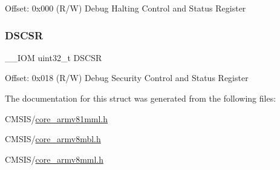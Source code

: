 Offset\+: 0x000 (R/W) Debug Halting Control and Status Register \mbox{\label{struct_core_debug___type_a2916e1173ded6e0fc26e8445e72a6087}} 
\subsubsection{\texorpdfstring{DSCSR}{DSCSR}}
{\footnotesize\ttfamily \+\_\+\+\_\+\+I\+OM uint32\+\_\+t D\+S\+C\+SR}

Offset\+: 0x018 (R/W) Debug Security Control and Status Register 

The documentation for this struct was generated from the following files\+:\begin{DoxyCompactItemize}
\item 
C\+M\+S\+I\+S/\mbox{\hyperlink{core__armv81mml_8h}{core\+\_\+armv81mml.\+h}}\item 
C\+M\+S\+I\+S/\mbox{\hyperlink{core__armv8mbl_8h}{core\+\_\+armv8mbl.\+h}}\item 
C\+M\+S\+I\+S/\mbox{\hyperlink{core__armv8mml_8h}{core\+\_\+armv8mml.\+h}}\end{DoxyCompactItemize}
